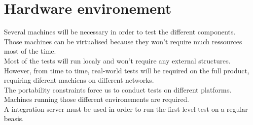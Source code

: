 \section{Hardware environement}
Several machines will be necessary in order to test the different components. Those machines can be virtualised because they won't require much ressources most of the time.\\

Most of the tests will run localy and won't require any external structures. However, from time to time, real-world tests will be required on the full product, requiring diferent machiens on different networks.\\

The portability constraints force us to conduct tests on different platforms. Machines running those different environements are required.\\

A integration server must be used in order to run the first-level test on a regular beasis.\\
